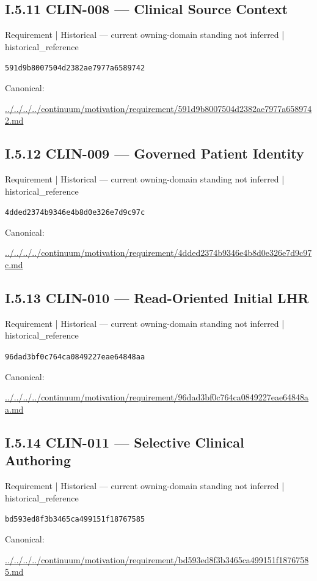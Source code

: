 \documentclass[10pt,a4paper]{article}
\begin{document}
\subsection*{I.5.11 CLIN-008 — Clinical Source Context}
{\small Requirement | Historical — current owning-domain standing not inferred | historical\_reference}\par
\texttt{591d9b8007504d2382ae7977a6589742}\par
Canonical: \par
{\footnotesize\url{../../../../continuum/motivation/requirement/591d9b8007504d2382ae7977a6589742.md}}\par
\subsection*{I.5.12 CLIN-009 — Governed Patient Identity}
{\small Requirement | Historical — current owning-domain standing not inferred | historical\_reference}\par
\texttt{4dded2374b9346e4b8d0e326e7d9c97c}\par
Canonical: \par
{\footnotesize\url{../../../../continuum/motivation/requirement/4dded2374b9346e4b8d0e326e7d9c97c.md}}\par
\subsection*{I.5.13 CLIN-010 — Read-Oriented Initial LHR}
{\small Requirement | Historical — current owning-domain standing not inferred | historical\_reference}\par
\texttt{96dad3bf0c764ca0849227eae64848aa}\par
Canonical: \par
{\footnotesize\url{../../../../continuum/motivation/requirement/96dad3bf0c764ca0849227eae64848aa.md}}\par
\subsection*{I.5.14 CLIN-011 — Selective Clinical Authoring}
{\small Requirement | Historical — current owning-domain standing not inferred | historical\_reference}\par
\texttt{bd593ed8f3b3465ca499151f18767585}\par
Canonical: \par
{\footnotesize\url{../../../../continuum/motivation/requirement/bd593ed8f3b3465ca499151f18767585.md}}\par
\end{document}

